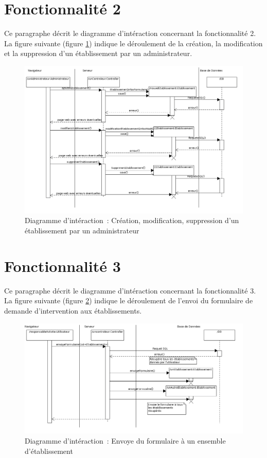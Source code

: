 \section{Fonctionnalité 2}
Ce paragraphe décrit le diagramme d'intéraction concernant la fonctionnalité 2. \\

La figure suivante (figure \ref{diagrammeInteraction3}) indique le déroulement de la création, la modification et la suppression d'un établissement par un administrateur.
\begin{figure}[H]
	\centering
	\includegraphics[scale=0.5]{images/diagrammesInteraction/03_diagrammeInteractionF2.png}
	\caption{Diagramme d'intéraction~: Création, modification, suppression d'un établissement par un administrateur}
	\label{diagrammeInteraction3}
\end{figure}

\section{Fonctionnalité 3}
Ce paragraphe décrit le diagramme d'intéraction concernant la fonctionnalité 3. \\

La figure suivante (figure \ref{diagrammeInteraction4}) indique le déroulement de l'envoi du formulaire de demande d'intervention aux établissements.
\begin{figure}[H]
	\centering
	\includegraphics[scale=0.5]{images/diagrammesInteraction/04_diagrammeInteractionF3.png}
	\caption{Diagramme d'intéraction~: Envoye du formulaire à un ensemble d'établissement}
	\label{diagrammeInteraction4}
\end{figure}


